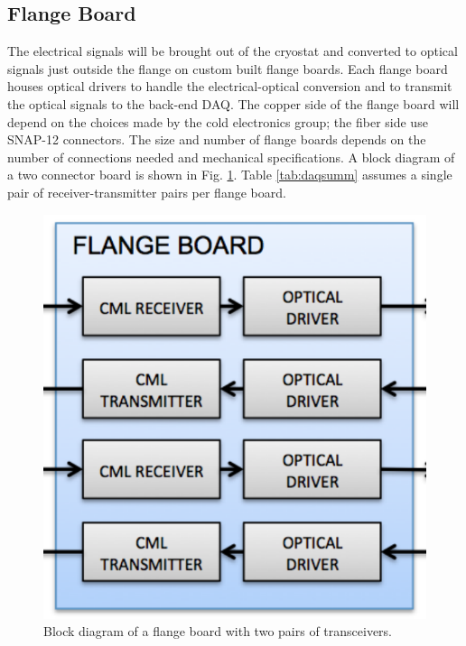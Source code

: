 \subsection{Flange Board}

The electrical signals will be brought out of the cryostat and converted to optical signals just outside the flange on custom built flange boards.   Each flange board houses optical drivers to handle the electrical-optical conversion and to transmit the optical signals to the  back-end DAQ.  The copper side of the flange board will depend on the choices made by the cold electronics group; the fiber side use SNAP-12 connectors.  The size and number of flange boards depends on the number of connections needed and mechanical specifications.  A block diagram of a two connector board is shown in Fig. \ref{fig:flange}.  Table \ref{tab:daqsumm} assumes a single pair of receiver-transmitter pairs per flange board.  



\begin{figure}[htb]
\includegraphics[scale=0.6]{flange-board.pdf}
\caption{Block diagram of a flange board with two pairs of transceivers.}
\label{fig:flange}
\end{figure} 

